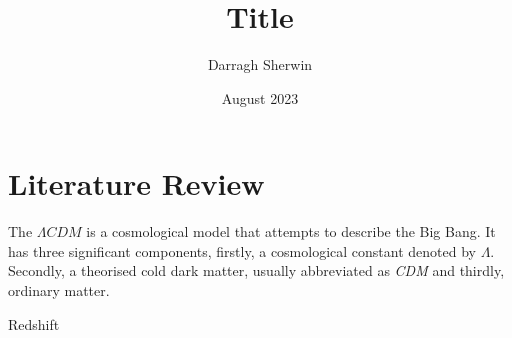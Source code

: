 \documentclass[12pt, a4paper]{article}
\title{Title}
\author{Darragh Sherwin}
\date{August 2023}
\begin{document}
\section{Literature Review}

The $\Lambda CDM$ is a cosmological model that attempts to describe the Big Bang. It has three significant components, firstly, a cosmological constant denoted by $\Lambda$. Secondly, a theorised cold dark matter, usually abbreviated as \textit{CDM} and thirdly, ordinary matter.

Redshift 
\end{document}
